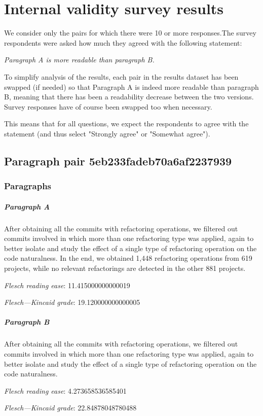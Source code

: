 \chapter{Internal validity survey results\label{app:survey-results}}

We consider only the pairs for which there were 10 or more responses.The survey respondents were asked how much they agreed with the following statement:

\begin{displayquote}
\emph{Paragraph A is more readable than paragraph B.}
\end{displayquote}

To simplify analysis of the results, each pair in the results dataset has been swapped (if needed) so that Paragraph A is indeed more readable than paragraph B, meaning that there has been a readability decrease between the two versions. Survey responses have of course been swapped too when necessary.

This means that for all questions, we expect the respondents to agree with the statement (and thus select "Strongly agree" or "Somewhat agree").

\section{Paragraph pair 5eb233fadeb70a6af2237939}
\subsection{Paragraphs}
\paragraph{Paragraph A}
After obtaining all the commits with refactoring operations, we filtered out commits involved in which more than one refactoring type was applied, again to better isolate and study the effect of a single type of refactoring operation on the code naturalness. In the end, we obtained 1,448 refactoring operations from 619 projects, while no relevant refactorings are detected in the other 881 projects.\par\medskip\emph{Flesch reading ease}: 11.415000000000019\par\emph{Flesch---Kincaid grade}: 19.120000000000005

\paragraph{Paragraph B}
After obtaining all the commits with refactoring operations, we filtered out commits involved in which more than one refactoring type was applied, again to better isolate and study the effect of a single type of refactoring operation on the code naturalness.\par\medskip\emph{Flesch reading ease}: 4.273658536585401\par\emph{Flesch---Kincaid grade}: 22.84878048780488

